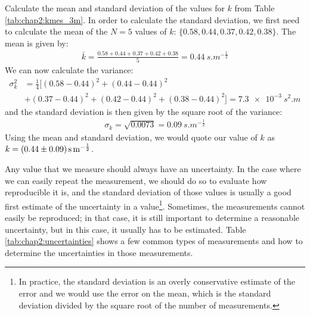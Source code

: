 \begin{example}{Calculate the mean and standard deviation of the values for $k$ from Table \ref{tab:chap2:kmes_3m}.}
\label{ex:chap2:stdcalc}
In order to calculate the standard deviation, we first need to calculate the mean of the $N=5$ values of $k$: $\{0.58, 0.44, 0.37, 0.42, 0.38 \}$. The mean is given by:
\begin{align*}
\bar k = \frac{0.58 + 0.44 + 0.37 + 0.42 + 0.38}{5}=\SI{0.44}{s.m^{-\frac{1}{2}}}
\end{align*}
We can now calculate the variance:
\begin{align*}
\sigma^2_k &= \frac{1}{4}[(0.58-0.44)^2+(0.44-0.44)^2\\
         &+(0.37-0.44)^2+(0.42-0.44)^2+(0.38-0.44)^2]=\SI{7.3e-3}{s^2.m}
\end{align*}
and the standard deviation is then given by the square root of the variance:
\begin{align*}
\sigma_k=\sqrt{0.0073}=\SI{0.09}{s.m^{-\frac{1}{2}}}
\end{align*}
Using the mean and standard deviation, we would quote our value of $k$ as $k=\SI{0.44 \pm 0.09}{s.m^{-\frac{1}{2}}}$.
\end{example}
Any value that we measure should always have an uncertainty. In the case where we can easily repeat the measurement, we should do so to evaluate how reproducible it is, and the standard deviation of those values is usually a good first estimate of the uncertainty in a value\footnote{In practice, the standard deviation is an overly conservative estimate of the error and we would use the error on the mean, which is the standard deviation divided by the square root of the number of measurements.}. Sometimes, the measurements cannot easily be reproduced; in that case, it is still important to determine a reasonable uncertainty, but in this case, it usually has to be estimated. Table \ref{tab:chap2:uncertainties} shows a few common types of measurements and how to determine the uncertainties in those measurements. 

